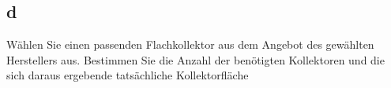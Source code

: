 \subsection{d}
Wählen Sie einen passenden Flachkollektor aus dem Angebot des gewählten Herstellers aus. Bestimmen
Sie die Anzahl der benötigten Kollektoren und die sich daraus ergebende tatsächliche Kollektorfläche